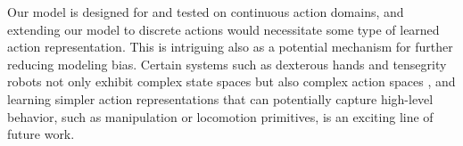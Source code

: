 Our model is designed for and tested on continuous action domains, and extending our model to discrete actions would necessitate some type of learned action representation. This is intriguing also as a potential mechanism for further reducing modeling bias. Certain systems such as dexterous hands and tensegrity robots not only exhibit complex state spaces but also complex action spaces \citep{hand-rail,hand-openai,superball}, and learning simpler action representations that can potentially capture high-level behavior, such as manipulation or locomotion primitives, is an exciting line of future work.

\solarack
